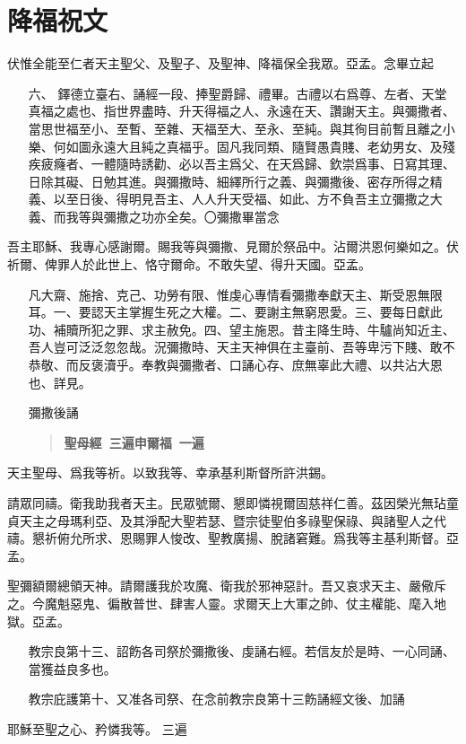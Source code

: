 \section*{降福祝文}
伏惟全能至仁者天主聖父、及聖子、及聖神、降福保全我眾。{\cspace}亞孟。{\small 念畢立起}
\begin{enumerate}
    \item[六、]{\small 鐸德立臺右、誦經一段、捧聖爵歸、禮畢。古禮以右爲尊、左者、天堂真福之處也、指世界盡時、升天得福之人、永遠在天、讚謝天主。與彌撒者、當思世福至小、至暫、至雜、天福至大、至永、至純。與其徇目前暫且離之小樂、何如圖永遠大且純之真福乎。固凡我同類、隨賢愚貴賤、老幼男女、及殘疾疲癃者、一體隨時誘勸、必以吾主爲父、在天爲歸、欽崇爲事、日寫其理、日除其礙、日勉其進。與彌撒時、細繹所行之義、與彌撒後、密存所得之精義、以至日後、得明見吾主、人人升天受福、如此、方不負吾主立彌撒之大義、而我等與彌撒之功亦全矣。〇彌撒畢當念}
\end{enumerate}
吾主耶穌、我專心感謝爾。賜我等與彌撒、見爾於祭品中。沾爾洪恩何樂如之。伏祈爾、俾罪人於此世上、恪守爾命。不敢失望、得升天國。{\cspace}亞孟。
\begin{enumerate}
    \item[]{\small 凡大齋、施捨、克己、功勞有限、惟虔心專情看彌撒奉獻天主、斯受恩無限耳。一、要認天主掌握生死之大權。二、要謝主無窮恩愛。三、要每日獻此功、補贖所犯之罪、求主赦免。四、望主施恩。昔主降生時、牛驢尚知近主、吾人豈可泛泛忽忽哉。況彌撒時、天主天神俱在主臺前、吾等卑污下賤、敢不恭敬、而反褒瀆乎。奉教與彌撒者、口誦心存、庶無辜此大禮、以共沾大恩也、詳見。}
    \item[]{\small 彌撒後誦}
    \begin{quote}\bfseries 聖母經\ {\rm\small 三遍}\quad 申爾福\ {\rm\small 一遍}\end{quote}
\end{enumerate}
\versicle 天主聖母、爲我等祈。\response 以致我等、幸承基利斯督所許洪錫。

請眾同禱。{\cspace}衛我助我者天主。民眾號爾、懇即憐視爾固慈祥仁善。茲因榮光無玷童貞天主之母瑪利亞、及其淨配大聖若瑟、暨宗徒聖伯多祿聖保祿、與諸聖人之代禱。懇祈俯允所求、恩賜罪人悛改、聖教廣揚、脫諸窘難。爲我等主基利斯督。{\cspace}亞孟。

聖彌額爾總領天神。請爾護我於攻魔、衛我於邪神惡計。吾又哀求天主、嚴儆斥之。今魔魁惡鬼、徧散普世、肆害人靈。求爾天上大軍之帥、仗主權能、麾入地獄。{\cspace}亞孟。

\begin{enumerate}
    \item[]{\small 教宗良第十三、詔飭各司祭於彌撒後、虔誦右經。若信友於是時、一心同誦、當獲益良多也。}
    \item[]{\small 教宗庇護第十、又准各司祭、在念前教宗良第十三飭誦經文後、加誦}
\end{enumerate}
耶穌至聖之心、矜憐我等。 {\small 三遍}
